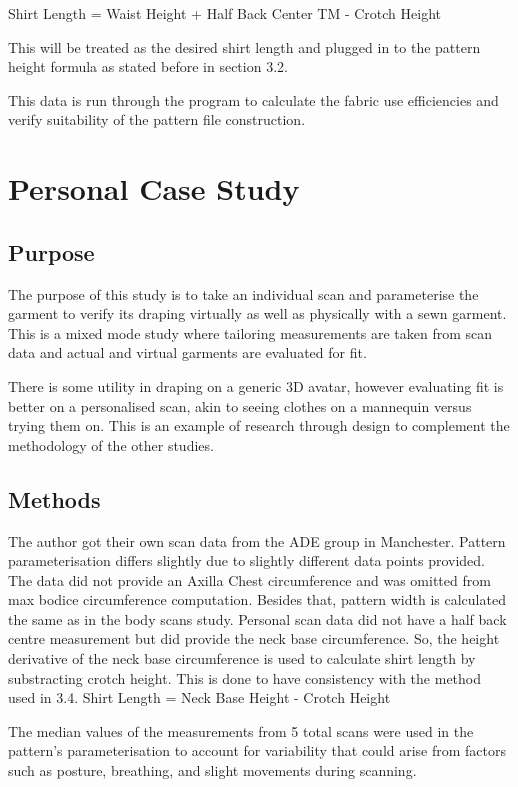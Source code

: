 Shirt Length = Waist Height + Half Back Center TM - Crotch Height

This will be treated as the desired shirt length and plugged in to the pattern height formula as stated before in section 3.2. 

This data is run through the program to calculate the fabric use efficiencies and verify suitability of the pattern file construction.

\section{Personal Case Study}
\subsection{Purpose}
The purpose of this study is to take an individual scan and parameterise the garment to verify its draping virtually as well as physically with a sewn garment. This is a mixed mode study where tailoring measurements are taken from scan data and actual and virtual garments are evaluated for fit.

There is some utility in draping on a generic 3D avatar, however evaluating fit is better on a personalised scan, akin to seeing clothes on a mannequin versus trying them on. This is an example of research through design to complement the methodology of the other studies.

\subsection{Methods}
The author got their own scan data from the ADE group in Manchester. Pattern parameterisation differs slightly due to slightly different data points provided. The data did not provide an Axilla Chest circumference and was omitted from max bodice circumference computation. Besides that, pattern width is calculated the same as in the body scans study. Personal scan data did not have a half back centre measurement but did provide the neck base circumference. So, the height derivative of the neck base circumference is used to calculate shirt length by substracting crotch height. This is done to have consistency with the method used in 3.4.
Shirt Length = Neck Base Height - Crotch Height
					
The median values of the measurements from 5 total scans were used in the pattern's parameterisation to account for variability that could arise from factors such as posture, breathing, and slight movements during scanning.